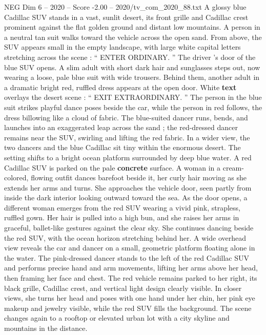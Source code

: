 \begin{textsample}{NEG Dim 6 – 2020 – Score -2.00 – 2020/tv\_com\_2020\_88.txt}  \label{ex:f6_neg_038}
A glossy blue Cadillac SUV stands in a vast, sunlit desert, its front grille and Cadillac crest prominent against the flat golden ground and distant low mountains.
A person in a neutral tan suit walks toward the vehicle across the open sand.
From above, the SUV appears small in the empty landscape, with large white capital letters stretching across the scene : “ ENTER ORDINARY. ” The driver ’s door of the blue SUV opens.
A slim adult with short dark hair and sunglasses steps out, now wearing a loose, pale blue suit with wide trousers.
Behind them, another adult in a dramatic bright red, ruffled dress appears at the open door.
White \textbf{text} overlays the desert scene : “ EXIT EXTRAORDINARY. ” The person in the blue suit strikes playful dance poses beside the car, while the person in red follows, the dress billowing like a cloud of fabric.
The blue-suited dancer runs, bends, and launches into an exaggerated leap across the sand ; the red-dressed dancer remains near the SUV, swirling and lifting the red fabric.
In a wider view, the two dancers and the blue Cadillac sit tiny within the enormous desert.
The setting shifts to a bright ocean platform surrounded by deep blue water.
A red Cadillac SUV is parked on the pale \textbf{concrete} surface.
A woman in a cream-colored, flowing outfit dances barefoot beside it, her curly hair moving as she extends her arms and turns.
She approaches the vehicle door, seen partly from inside the dark interior looking outward toward the sea.
As the door opens, a different woman emerges from the red SUV wearing a vivid pink, strapless, ruffled gown.
Her hair is pulled into a high bun, and she raises her arms in graceful, ballet-like gestures against the clear sky.
She continues dancing beside the red SUV, with the ocean horizon stretching behind her.
A wide overhead view reveals the car and dancer on a small, geometric platform floating alone in the water.
The pink-dressed dancer stands to the left of the red Cadillac SUV and performs precise hand and arm movements, lifting her arms above her head, then framing her face and chest.
The red vehicle remains parked to her right, its black grille, Cadillac crest, and vertical light design clearly visible.
In closer views, she turns her head and poses with one hand under her chin, her pink eye makeup and jewelry visible, while the red SUV fills the background.
The scene changes again to a rooftop or elevated urban lot with a city skyline and mountains in the distance.

\end{textsample}
